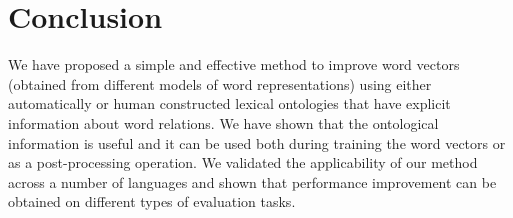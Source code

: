 \documentclass[11pt]{article}
\begin{document}
\section{Conclusion}

We have proposed a simple and effective method to improve
word vectors (obtained from different models of word representations)
using either automatically or human constructed lexical ontologies
that have explicit information about word relations. We have shown that
the ontological information is useful and it can be used both during training
the word vectors or as a post-processing operation. We validated the
applicability of our method across a number of languages and shown that 
performance improvement can be obtained on different types of evaluation tasks.



\end{document}
